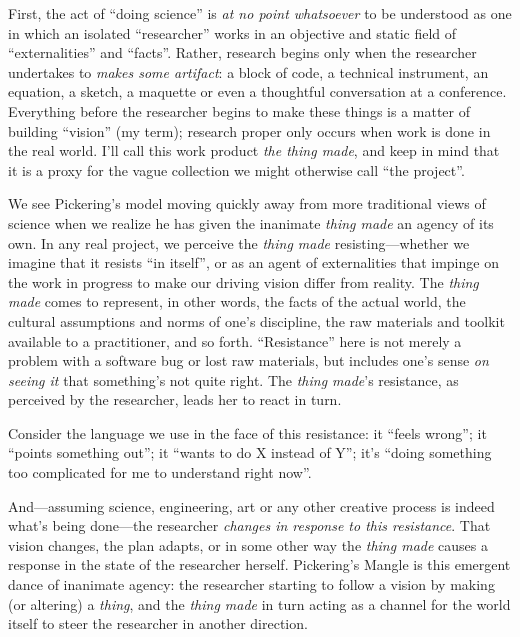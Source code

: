 First, the act of ``doing science'' is \emph{at no point whatsoever} to be understood as one in which an isolated ``researcher'' works in an objective and static field of ``externalities'' and ``facts''. Rather, research begins only when the researcher undertakes to \emph{makes some artifact}: a block of code, a technical instrument, an equation, a sketch, a maquette or even a thoughtful conversation at a conference. Everything before the researcher begins to make these things is a matter of building ``vision'' (my term); research proper only occurs when work is done in the real world. I'll call this work product \emph{the thing made}, and keep in mind that it is a proxy for the vague collection we might otherwise call ``the project''.

We see Pickering's model moving quickly away from more traditional views of science when we realize he has given the inanimate \emph{thing made} an agency of its own. In any real project, we perceive the \emph{thing made} resisting---whether we imagine that it resists ``in itself'', or as an agent of externalities that impinge on the work in progress to make our driving vision differ from reality. The \emph{thing made} comes to represent, in other words, the facts of the actual world, the cultural assumptions and norms of one's discipline, the raw materials and toolkit available to a practitioner, and so forth. ``Resistance'' here is not merely a problem with a software bug or lost raw materials, but includes one's sense \emph{on seeing it} that something's not quite right. The \emph{thing made}'s resistance, as perceived by the researcher, leads her to react in turn.

Consider the language we use in the face of this resistance: it ``feels wrong''; it ``points something out''; it ``wants to do X instead of Y''; it's ``doing something too complicated for me to understand right now''.

And---assuming science, engineering, art or any other creative process is indeed what's being done---the researcher \emph{changes in response to this resistance}. That vision changes, the plan adapts, or in some other way the \emph{thing made} causes a response in the state of the researcher herself. Pickering's Mangle is this emergent dance of inanimate agency: the researcher starting to follow a vision by making (or altering) a \emph{thing}, and the \emph{thing made} in turn acting as a channel for the world itself to steer the researcher in another direction.


